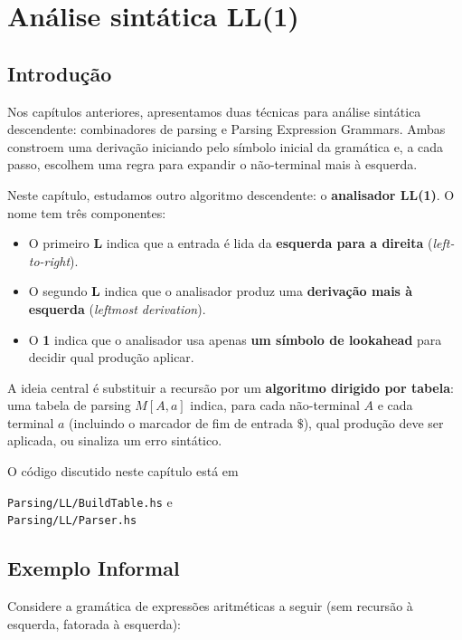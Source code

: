 \chapter{Análise sintática LL(1)}

\section{Introdução}

Nos capítulos anteriores, apresentamos duas técnicas para análise
sintática descendente: combinadores de parsing e Parsing Expression
Grammars. Ambas constroem uma derivação iniciando pelo símbolo
inicial da gramática e, a cada passo, escolhem uma regra para
expandir o não-terminal mais à esquerda.

Neste capítulo, estudamos outro algoritmo descendente: o
\textbf{analisador LL(1)}. O nome tem três componentes:

\begin{itemize}
  \item
    O primeiro \textbf{L} indica que a entrada é lida da
    \textbf{esquerda para a direita} (\emph{left-to-right}).
  \item
    O segundo \textbf{L} indica que o analisador produz uma
    \textbf{derivação mais à esquerda} (\emph{leftmost derivation}).
  \item
    O \textbf{1} indica que o analisador usa apenas \textbf{um
    símbolo de lookahead} para decidir qual produção aplicar.
\end{itemize}

A ideia central é substituir a recursão por um \textbf{algoritmo
dirigido por tabela}: uma tabela de parsing \(M[A, a]\) indica, para
cada não-terminal \(A\) e cada terminal \(a\) (incluindo o marcador
de fim de entrada \(\$\)), qual produção deve ser aplicada, ou
sinaliza um erro sintático.

O código discutido neste capítulo está em
\begin{flushleft}
  \verb|Parsing/LL/BuildTable.hs| e\\
  \verb|Parsing/LL/Parser.hs|
\end{flushleft}

\section{Exemplo Informal}

Considere a gramática de expressões aritméticas a seguir (sem
recursão à esquerda, fatorada à esquerda):

